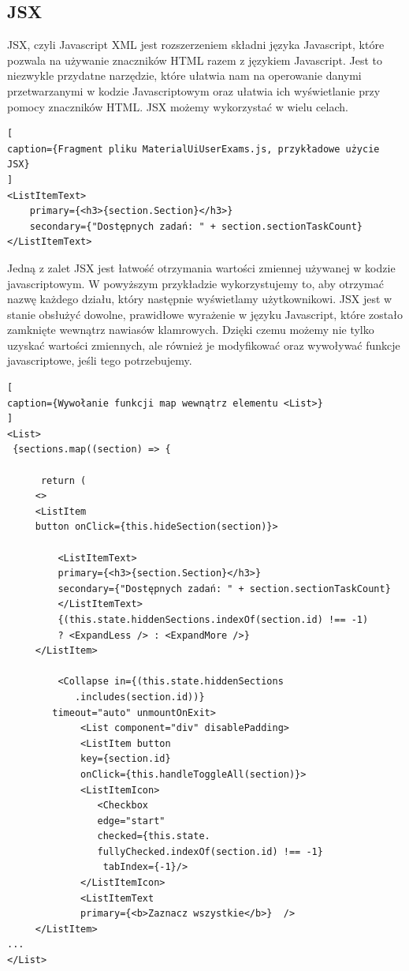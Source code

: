 \documentclass[oneside,polski,logo,indent]{amuthesis}
\begin{document}

\subsection{JSX}

{
JSX, czyli Javascript XML jest rozszerzeniem składni języka Javascript, które pozwala na używanie znaczników HTML razem z językiem Javascript. Jest to niezwykle przydatne narzędzie, które ułatwia nam na operowanie danymi przetwarzanymi w kodzie Javascriptowym oraz ułatwia ich wyświetlanie przy pomocy znaczników HTML. JSX możemy wykorzystać w wielu celach.



\begin{lstlisting}[
caption={Fragment pliku MaterialUiUserExams.js, przykładowe użycie JSX}
]
<ListItemText>
	primary={<h3>{section.Section}</h3>}
	secondary={"Dostępnych zadań: " + section.sectionTaskCount}
</ListItemText>
\end{lstlisting}



Jedną z zalet JSX jest łatwość otrzymania wartości zmiennej używanej w kodzie javascriptowym. W powyższym przykładzie wykorzystujemy to, aby otrzymać nazwę każdego działu, który następnie wyświetlamy użytkownikowi.
JSX jest w stanie obsłużyć dowolne, prawidłowe wyrażenie w języku Javascript, które zostało zamknięte wewnątrz nawiasów klamrowych. Dzięki czemu możemy nie tylko uzyskać wartości zmiennych, ale również je modyfikować oraz wywoływać funkcje javascriptowe, jeśli tego potrzebujemy.



\begin{lstlisting}[
caption={Wywołanie funkcji map wewnątrz elementu <List>}
]
<List>
 {sections.map((section) => {
                     
	  return (
	 <>
	 <ListItem
	 button onClick={this.hideSection(section)}>

		 <ListItemText>
		 primary={<h3>{section.Section}</h3>}
		 secondary={"Dostępnych zadań: " + section.sectionTaskCount}
		 </ListItemText>
		 {(this.state.hiddenSections.indexOf(section.id) !== -1)
		 ? <ExpandLess /> : <ExpandMore />}
	 </ListItem>

		 <Collapse in={(this.state.hiddenSections
			.includes(section.id))} 
		timeout="auto" unmountOnExit>
			 <List component="div" disablePadding>
			 <ListItem button
			 key={section.id}
			 onClick={this.handleToggleAll(section)}>
			 <ListItemIcon>
			 	<Checkbox
			 	edge="start"
			 	checked={this.state.
				fullyChecked.indexOf(section.id) !== -1}
				 tabIndex={-1}/>
			 </ListItemIcon>
			 <ListItemText 
			 primary={<b>Zaznacz wszystkie</b>}  />
	 </ListItem>
...
</List>
\end{lstlisting}



}
\end{document}
